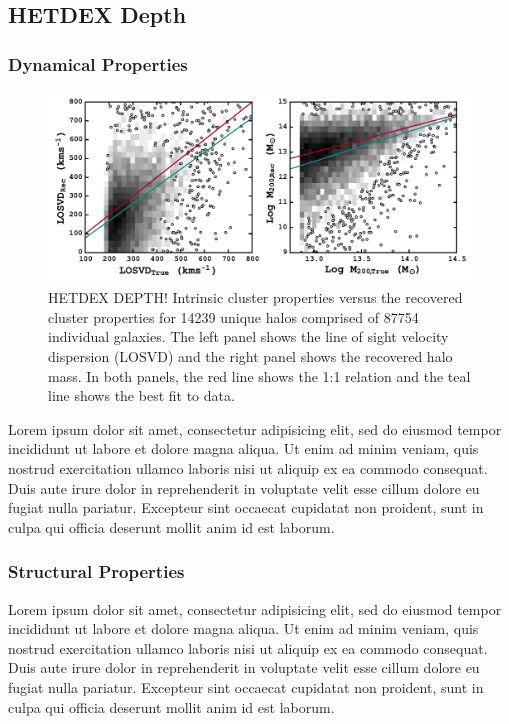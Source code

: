 \documentclass[apj, revtex4]{emulateapj}
\begin{document}
\subsection{HETDEX Depth}

\subsubsection{Dynamical Properties}
\begin{figure} 
	\includegraphics[width=\textwidth]{hetdexDepth.pdf} 
	\caption{HETDEX DEPTH! Intrinsic cluster properties versus the recovered cluster properties for 14239 unique halos comprised of 87754 individual galaxies. The left panel shows the line of sight velocity dispersion (LOSVD) and the right panel shows the recovered halo mass. In both panels, the red line shows the 1:1 relation and the teal line shows the best fit to data.} 
	\label{fig:hetdexDepth} 
\end{figure}
Lorem ipsum dolor sit amet, consectetur adipisicing elit, sed do eiusmod tempor incididunt ut labore et dolore magna aliqua. Ut enim ad minim veniam, quis nostrud exercitation ullamco laboris nisi ut aliquip ex ea commodo consequat. Duis aute irure dolor in reprehenderit in voluptate velit esse cillum dolore eu fugiat nulla pariatur. Excepteur sint occaecat cupidatat non proident, sunt in culpa qui officia deserunt mollit anim id est laborum.

\subsubsection{Structural Properties}
Lorem ipsum dolor sit amet, consectetur adipisicing elit, sed do eiusmod tempor incididunt ut labore et dolore magna aliqua. Ut enim ad minim veniam, quis nostrud exercitation ullamco laboris nisi ut aliquip ex ea commodo consequat. Duis aute irure dolor in reprehenderit in voluptate velit esse cillum dolore eu fugiat nulla pariatur. Excepteur sint occaecat cupidatat non proident, sunt in culpa qui officia deserunt mollit anim id est laborum.
\end{document}

